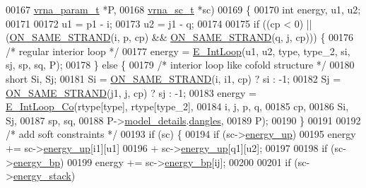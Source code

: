 \begin{DoxyCode}
00167                   \mbox{\hyperlink{group__energy__parameters_structvrna__param__s}{vrna\_param\_t}}  *P,
00168                   \mbox{\hyperlink{group__soft__constraints_structvrna__sc__s}{vrna\_sc\_t}}     *sc)
00169 \{
00170   \textcolor{keywordtype}{int} energy, u1, u2;
00171 
00172   u1  = p1 - i;
00173   u2  = j1 - q;
00174 
00175   \textcolor{keywordflow}{if} ((cp < 0) || (\mbox{\hyperlink{interior__loops_8h_a6b109d72bf39073254090cf105a17641}{ON\_SAME\_STRAND}}(i, p, cp) && \mbox{\hyperlink{interior__loops_8h_a6b109d72bf39073254090cf105a17641}{ON\_SAME\_STRAND}}(q, j, cp))) \{
00176     \textcolor{comment}{/* regular interior loop */}
00177     energy = \mbox{\hyperlink{group__loops_gaafbc187b7f78e8e82afb77dd6f3b8fc5}{E\_IntLoop}}(u1, u2, type, type\_2, si, sj, sp, sq, P);
00178   \} \textcolor{keywordflow}{else} \{
00179     \textcolor{comment}{/* interior loop like cofold structure */}
00180     \textcolor{keywordtype}{short} Si, Sj;
00181     Si      = \mbox{\hyperlink{interior__loops_8h_a6b109d72bf39073254090cf105a17641}{ON\_SAME\_STRAND}}(i, i1, cp) ? si : -1;
00182     Sj      = \mbox{\hyperlink{interior__loops_8h_a6b109d72bf39073254090cf105a17641}{ON\_SAME\_STRAND}}(j1, j, cp) ? sj : -1;
00183     energy  = \mbox{\hyperlink{group__loops_ga2d2e4f3f3448c9060763dac6c0c489f0}{E\_IntLoop\_Co}}(rtype[type], rtype[type\_2],
00184                            i, j, p, q,
00185                            cp,
00186                            Si, Sj,
00187                            sp, sq,
00188                            P->\mbox{\hyperlink{group__energy__parameters_a7b84353eb9075c595bad4ceb871bcae7}{model\_details}}.\mbox{\hyperlink{group__model__details_adcda4ff2ea77748ae0e8700288282efc}{dangles}},
00189                            P);
00190   \}
00191 
00192   \textcolor{comment}{/* add soft constraints */}
00193   \textcolor{keywordflow}{if} (sc) \{
00194     \textcolor{keywordflow}{if} (sc->\mbox{\hyperlink{group__soft__constraints_a57e4dbb924ab11f304e3762a3a9b07a1}{energy\_up}})
00195       energy += sc->\mbox{\hyperlink{group__soft__constraints_a57e4dbb924ab11f304e3762a3a9b07a1}{energy\_up}}[i1][u1]
00196                 + sc->\mbox{\hyperlink{group__soft__constraints_a57e4dbb924ab11f304e3762a3a9b07a1}{energy\_up}}[q1][u2];
00197 
00198     \textcolor{keywordflow}{if} (sc->\mbox{\hyperlink{group__soft__constraints_ad139b8e06632e00cbcf3909815d0d03d}{energy\_bp}})
00199       energy += sc->\mbox{\hyperlink{group__soft__constraints_ad139b8e06632e00cbcf3909815d0d03d}{energy\_bp}}[ij];
00200 
00201     \textcolor{keywordflow}{if} (sc->\mbox{\hyperlink{group__soft__constraints_ac20dded6068e81acd0f1139092f66a22}{energy\_stack}})

\end{DoxyCode}
